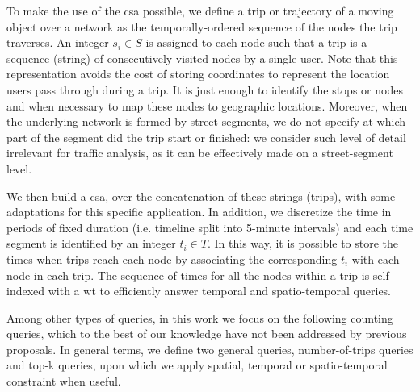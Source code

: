 	To make the
	use of the \gls{csa} possible, we define a trip or trajectory of a moving object
	over a network as the temporally-ordered sequence of the nodes the trip
	traverses. An integer $s_i \in S$ is assigned to each node such that a trip is a sequence (string) of consecutively visited nodes by a single user. Note that this representation avoids the cost of storing coordinates to represent the location users pass through during a trip. It is just enough to identify the stops or nodes and when necessary to map these nodes to geographic locations. Moreover, when the underlying network is formed by street segments, we do not specify at which part of the segment did the trip start or finished: we consider such level of detail irrelevant for traffic analysis, as it can be effectively made on a street-segment level.
	
	We then build a \gls{csa}, over the concatenation of
	these strings (trips), with some adaptations for this
	specific application. In addition, we discretize the time in periods of fixed
	duration (i.e. timeline split into 5-minute intervals) and each time
	segment is identified by an integer $t_i \in T$. In this way, it is possible
	to store the times when trips reach each node by associating the
	corresponding $t_i$ with each node in each trip. The sequence of
	times for all the nodes within a trip is self-indexed with a \gls{wt}
	to efficiently answer temporal and spatio-temporal queries.

	Among other types of queries, in this work we focus on the following counting queries, which to the best of our knowledge have not been  addressed by previous proposals. In general terms, we define two general queries, number-of-trips queries and top-k queries, upon which we apply spatial, temporal or spatio-temporal constraint when useful.

